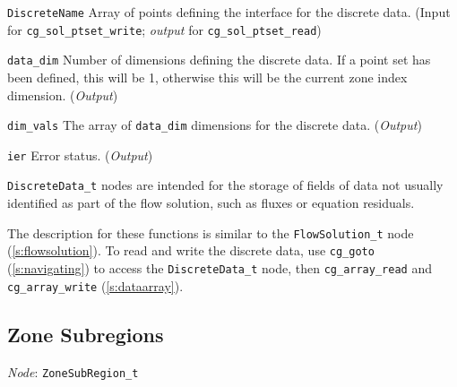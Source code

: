 \begin{Ventryi}{\texttt{DiscreteName}}
      Array of points defining the interface for the discrete data.
      (\textcolor{input}{Input} for \texttt{cg\_sol\_ptset\_write};
      \textcolor{output}{\textit{output}} for
      \texttt{cg\_sol\_ptset\_read})
\item [\texttt{data\_dim}]
      Number of dimensions defining the discrete data.
      If a point set has been defined, this will be 1,
      otherwise this will be the current zone index dimension.
      (\textcolor{output}{\textit{Output}})
\item [\texttt{dim\_vals}]
      The array of \texttt{data\_dim} dimensions for the discrete data.
      (\textcolor{output}{\textit{Output}})
\item [\texttt{ier}]
      Error status.
      (\textcolor{output}{\textit{Output}})
\end{Ventryi}

\texttt{DiscreteData\_t} nodes are intended for the storage of fields
of data not usually identified as part of the flow solution, such as
fluxes or equation residuals.

The description for these functions is similar to the
\texttt{FlowSolution\_t} node (\autoref{s:flowsolution}).
To read and write the discrete data, use
\texttt{cg\_goto} (\autoref{s:navigating}) to access the
\texttt{DiscreteData\_t} node, then
\texttt{cg\_array\_read} and \texttt{cg\_array\_write} (\autoref{s:dataarray}).

\newpage
\subsection{Zone Subregions}
\label{s:subregion}

\noindent
\textit{Node}: \texttt{ZoneSubRegion\_t}

